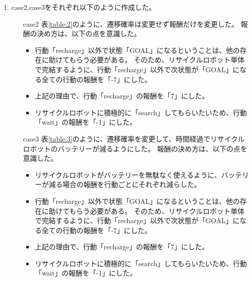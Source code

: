 \begin{enumerate}
  \item case2,case3をそれぞれ以下のように作成した。
  \begin{itemize}
    \item[case2] 表\ref{table:2}のように、遷移確率は変更せず報酬だけを変更した。
    報酬の決め方は、以下の点を意識した。
    \begin{itemize}
      \item 行動「recharge」以外で状態「GOAL」になるということは、他の存在に助けてもらう必要がある。
      そのため、リサイクルロボット単体で完結するように、行動「recharge」以外で次状態が「GOAL」になる全ての行動の報酬を「-7」にした。
      \item 上記の理由で、行動「recharge」の報酬を「7」にした。
      \item リサイクルロボットに積極的に「search」してもらいたいため、行動「wait」の報酬を「-1」にした。
    \end{itemize}
    \item[case3] 表\ref{table:3}のように、遷移確率を変更して、時間経過でリサイクルロボットのバッテリーが減るようにした。
    報酬の決め方は、以下の点を意識した。
    \begin{itemize}
      \item リサイクルロボットがバッテリーを無駄なく使えるように、バッテリーが減る場合の報酬を行動ごとにそれぞれ減らした。
      \item 行動「recharge」以外で状態「GOAL」になるということは、他の存在に助けてもらう必要がある。
      そのため、リサイクルロボット単体で完結するように、行動「recharge」以外で次状態が「GOAL」になる全ての行動の報酬を「-7」にした。
      \item 上記の理由で、行動「recharge」の報酬を「7」にした。
      \item リサイクルロボットに積極的に「search」してもらいたいため、行動「wait」の報酬を「-1」にした。
    \end{itemize}
  \end{itemize}
  

\end{enumerate}
